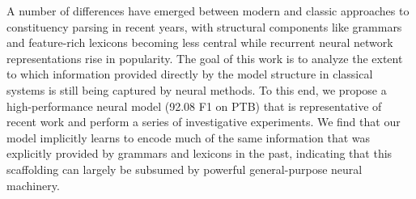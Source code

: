 A number of differences have emerged between modern and classic approaches to constituency parsing in recent years, with structural components like grammars and feature-rich lexicons becoming less central while recurrent neural network representations rise in popularity. The goal of this work is to analyze the extent to which information provided directly by the model structure in classical systems is still being captured by neural methods. To this end, we propose a high-performance neural model (92.08 F1 on PTB) that is representative of recent work and perform a series of investigative experiments. We find that our model implicitly learns to encode much of the same information that was explicitly provided by grammars and lexicons in the past, indicating that this scaffolding can largely be subsumed by powerful general-purpose neural machinery.
